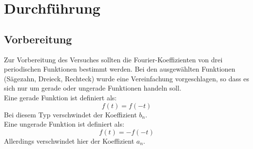 \section{Durchführung}
\label{sec:Durchführung}
\subsection{Vorbereitung}
\label{sec:Vorbereitung}
Zur Vorbereitung des Versuches sollten die Fourier-Koeffizienten von drei periodischen Funktionen bestimmt werden. Bei den ausgewählten Funktionen (Sägezahn, Dreieck, Rechteck) wurde eine Vereinfachung vorgeschlagen, so dass es sich nur um gerade oder ungerade Funktionen handeln soll. 
\\
Eine gerade Funktion ist definiert als:
\begin{equation*}
\label{eqn:gerade}
f(t) = f(-t)
\end{equation*}
Bei diesem Typ verschwindet der Koeffizient $b_{n}$.
\\
Eine ungerade Funktion ist definiert als:
\begin{equation*}
\label{eqn:ungerade}
f(t) = -f(-t)
\end{equation*}
Allerdings verschwindet hier der Koeffizient $a_{n}$.
